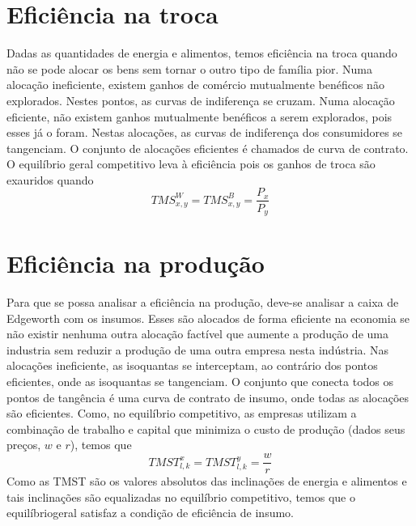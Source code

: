 \documentclass[oneside,12pt, letterpaper]{book}
\begin{document}
{{{\section{Efici{\^e}ncia na troca}
Dadas as quantidades de energia e alimentos, temos efici{\^e}ncia na troca quando n{\~a}o se pode alocar os bens sem tornar o outro tipo de fam{\'i}lia pior. Numa aloca{\c c}{\~a}o ineficiente, 
existem ganhos de com{\'e}rcio mutualmente ben{\'e}ficos n{\~a}o explorados. Nestes pontos, as curvas de indiferen{\c c}a se cruzam. Numa aloca{\c c}{\~a}o eficiente, n{\~a}o existem
ganhos mutualmente ben{\'e}ficos a serem explorados, pois esses j{\'a} o foram. Nestas aloca{\c c}{\~o}es, as curvas de indiferen{\c c}a dos consumidores se tangenciam. O conjunto
de aloca{\c c}{\~o}es eficientes {\'e} chamados de curva de contrato. O equil{\'i}brio geral competitivo leva {\`a} efici{\^e}ncia pois os ganhos de troca s{\~a}o exauridos quando 
\[ TMS^W_{x,y} = TMS^B_{x,y} = \frac{P_x}{P_y} \]
\section{Efici{\^e}ncia na produ{\c c}{\~a}o}
Para que se possa analisar a efici{\^e}ncia na produ{\c c}{\~a}o, deve-se analisar a caixa de Edgeworth com os insumos. Esses s{\~a}o alocados de forma eficiente na economia
se n{\~a}o existir nenhuma outra aloca{\c c}{\~a}o fact{\'i}vel que aumente a produ{\c c}{\~a}o  de uma industria sem reduzir a produ{\c c}{\~a}o  de uma outra empresa nesta ind{\'u}stria.
Nas aloca{\c c}{\~o}es ineficiente, as isoquantas se interceptam, ao contr{\'a}rio dos pontos eficientes, onde as isoquantas se tangenciam. O conjunto que conecta todos
os pontos de tang{\^e}ncia {\'e} uma curva de contrato de insumo, onde todas as aloca{\c c}{\~o}es s{\~a}o eficientes. Como, no equil{\'i}brio competitivo, as empresas utilizam  a
combina{\c c}{\~a}o de trabalho e capital que minimiza o custo de produ{\c c}{\~a}o (dados seus pre{\c c}os, $w$ e $r$), temos que 
\[ TMST^x_{l,k} = TMST^y_{l,k} = \frac{w}{r} \]
Como as TMST s{\~a}o os valores absolutos das inclina{\c c}{\~o}es de energia e alimentos e tais inclina{\c c}{\~o}es s{\~a}o equalizadas no equil{\'i}brio competitivo, temos que o equil{\'i}briogeral satisfaz 
a condi{\c c}{\~a}o de efici{\^e}ncia de insumo.
}}}
\end{document}
